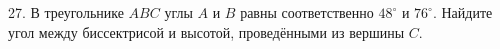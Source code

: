 27. В треугольнике $ABC$ углы $A$ и $B$ равны соответственно $48^\circ$ и $76^\circ.$ Найдите угол между биссектрисой и высотой, проведёнными из вершины $C.$\\
